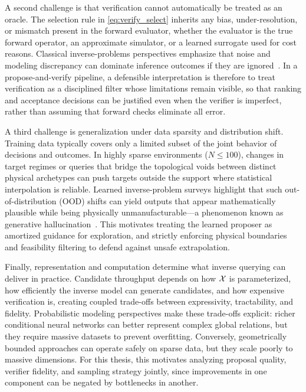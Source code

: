 A second challenge is that verification cannot automatically be treated as an oracle. The selection rule in \eqref{eq:verify_select} inherits any bias, under-resolution, or mismatch present in the forward evaluator, whether the evaluator is the true forward operator, an approximate simulator, or a learned surrogate used for cost reasons. Classical inverse-problems perspectives emphasize that noise and modeling discrepancy can dominate inference outcomes if they are ignored~\cite{Stuart2010}. In a propose-and-verify pipeline, a defensible interpretation is therefore to treat verification as a disciplined filter whose limitations remain visible, so that ranking and acceptance decisions can be justified even when the verifier is imperfect, rather than assuming that forward checks eliminate all error.

A third challenge is generalization under data sparsity and distribution shift. Training data typically covers only a limited subset of the joint behavior of decisions and outcomes. In highly sparse environments ($N \le 100$), changes in target regimes or queries that bridge the topological voids between distinct physical archetypes can push targets outside the support where statistical interpolation is reliable. Learned inverse-problem surveys highlight that such out-of-distribution (OOD) shifts can yield outputs that appear mathematically plausible while being physically unmanufacturable—a phenomenon known as generative hallucination~\cite{Ongie2020}. This motivates treating the learned proposer as amortized guidance for exploration, and strictly enforcing physical boundaries and feasibility filtering to defend against unsafe extrapolation.

Finally, representation and computation determine what inverse querying can deliver in practice. Candidate throughput depends on how $\mathcal{X}$ is parameterized, how efficiently the inverse model can generate candidates, and how expensive verification is, creating coupled trade-offs between expressivity, tractability, and fidelity. Probabilistic modeling perspectives make these trade-offs explicit: richer conditional neural networks can better represent complex global relations, but they require massive datasets to prevent overfitting. Conversely, geometrically bounded approaches can operate safely on sparse data, but they scale poorly to massive dimensions. For this thesis, this motivates analyzing proposal quality, verifier fidelity, and sampling strategy jointly, since improvements in one component can be negated by bottlenecks in another.

